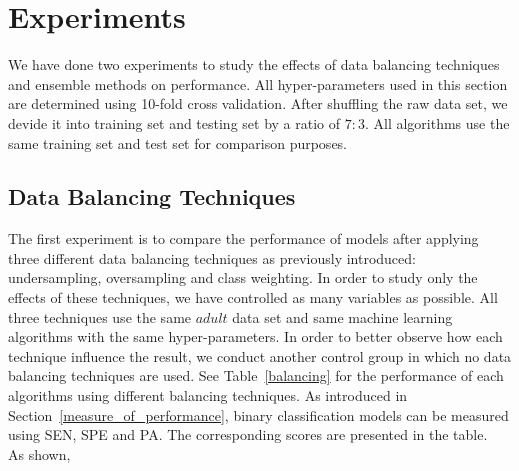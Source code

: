 \documentclass{article}
\begin{document}
\section{Experiments}
\label{experiments}

We have done two experiments to study the effects of data balancing techniques and ensemble methods on performance. All hyper-parameters used in this section are determined using 10-fold cross validation. After shuffling the raw data set, we devide it into training set and testing set by a ratio of $7:3$. All algorithms use the same training set and test set for comparison purposes.

\subsection{Data Balancing Techniques}
\label{balancing_experiment}

The first experiment is to compare the performance of models after applying three different data balancing techniques as previously introduced: undersampling, oversampling and class weighting. In order to study only the effects of these techniques, we have controlled as many variables as possible. All three techniques use the same $adult$ data set and same machine learning algorithms with the same hyper-parameters. In order to better observe how each technique influence the result, we conduct another control group in which no data balancing techniques are used. See Table~\ref{balancing} for the performance of each algorithms using different balancing techniques. As introduced in Section~\ref{measure_of_performance}, binary classification models can be measured using SEN, SPE and PA. The corresponding scores are presented in the table.\\

As shown,
\end{document}
